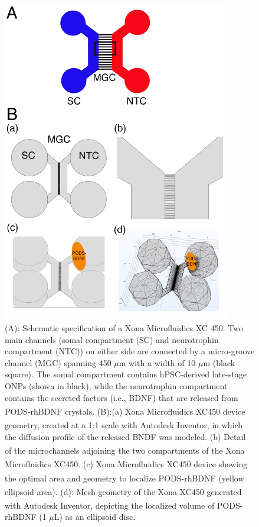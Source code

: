 \documentclass[review]{elsarticle}
\begin{document}
\begin{figure}
	\begin{center}
		\includegraphics[width=10cm]{Fig_3.jpg} %
	\end{center}
	\caption{(A): Schematic specification of a Xona\textsuperscript{\texttrademark} Microfluidics XC 450. Two main channels (somal compartment (SC) and neurotrophin compartment (NTC)) on either side are connected by a micro-groove channel (MGC) spanning 450 $\mu$m with a width of 10 $\mu$m (black square). The somal compartment contains hPSC-derived late-stage ONPs (shown in black), while the neurotrophin compartment contains the secreted factors (i.e., BDNF) that are released from PODS\textsuperscript{\textregistered}-rhBDNF crystals. (B):(a) Xona \textsuperscript{\texttrademark} Microfluidics XC450 device geometry, created at a 1:1 scale with Autodesk Inventor\textsuperscript{\textregistered}, in which the diffusion profile of the released BNDF was modeled. (b) Detail of the microchannels adjoining the two compartments of the Xona \textsuperscript{\texttrademark} Microfluidics XC450.  (c) Xona \textsuperscript{\texttrademark} Microfluidics XC450 device showing the optimal area and geometry to localize PODS\textsuperscript{\textregistered}-rhBDNF (yellow ellipsoid area). (d): Mesh geometry of the Xona\textsuperscript{\texttrademark} XC450 generated with Autodesk Inventor, depicting the localized volume of PODS\textsuperscript{\textregistered}-rhBDNF (1 $\mu$L) as an ellipsoid disc.}
\end{figure}
\end{document}
